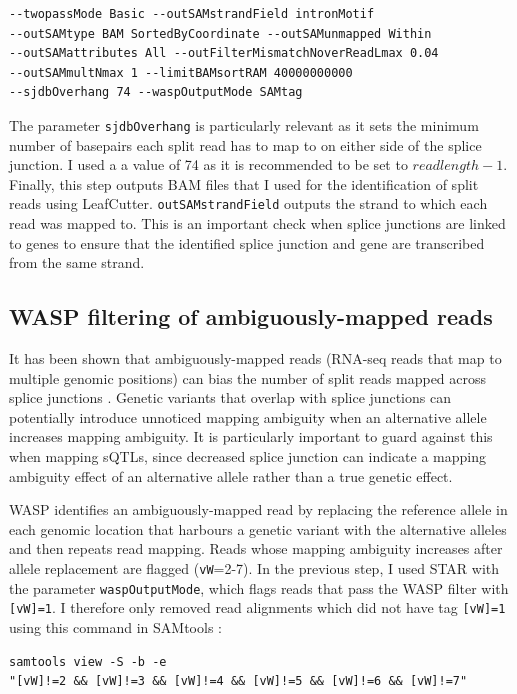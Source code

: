 \begin{verbatim}
--twopassMode Basic --outSAMstrandField intronMotif
--outSAMtype BAM SortedByCoordinate --outSAMunmapped Within
--outSAMattributes All --outFilterMismatchNoverReadLmax 0.04
--outSAMmultNmax 1 --limitBAMsortRAM 40000000000
--sjdbOverhang 74 --waspOutputMode SAMtag
\end{verbatim}
The parameter \Verb_sjdbOverhang_ is particularly relevant as it sets the minimum number of basepairs each split read has to map to on either side of the splice junction. I used a a value of 74 as it is recommended to be set to $read length -1$. Finally, this step outputs BAM files that I used for the identification of split reads using LeafCutter. \Verb_outSAMstrandField_ outputs the strand to which each read was mapped to. This is an important check when splice junctions are linked to genes to ensure that the identified splice junction and gene are transcribed from the same strand. 

\subsection{WASP filtering of ambiguously-mapped reads}
It has been shown that ambiguously-mapped reads (RNA-seq reads that map to multiple genomic positions) can bias the number of split reads mapped across splice junctions \cite{Van_de_Geijn2015-lb}. Genetic variants that overlap with splice junctions can potentially introduce unnoticed mapping ambiguity when an alternative allele increases mapping ambiguity. It is particularly important to guard against this when mapping sQTLs, since decreased splice junction can indicate a mapping ambiguity effect of an alternative allele rather than a true genetic effect.

WASP \cite{Van_de_Geijn2015-lb} identifies an ambiguously-mapped read by replacing the reference allele in each genomic location that harbours a genetic variant with the alternative alleles and then repeats read mapping. Reads whose mapping ambiguity increases after allele replacement are flagged (\Verb_vW_=2-7). In the previous step, I used STAR with the parameter \Verb_waspOutputMode_, which flags reads that pass the WASP filter with \Verb_[vW]=1_.  I therefore only removed read alignments which did not have tag \Verb_[vW]=1_ using this command in SAMtools \cite{Li2009-yk}:

\begin{verbatim}
samtools view -S -b -e 
"[vW]!=2 && [vW]!=3 && [vW]!=4 && [vW]!=5 && [vW]!=6 && [vW]!=7"
\end{verbatim}

